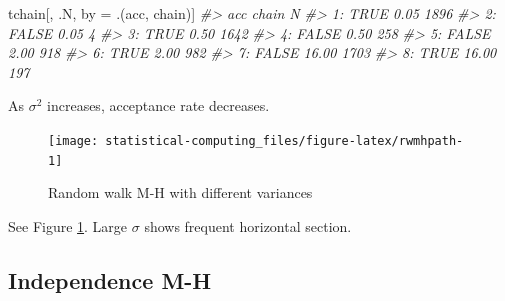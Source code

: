 \documentclass[]{book}
\newenvironment{Shaded}{\begin{snugshade}}{\end{snugshade}}
\newcommand{\CommentTok}[1]{\textcolor[rgb]{0.56,0.35,0.01}{\textit{#1}}}
\newcommand{\DataTypeTok}[1]{\textcolor[rgb]{0.13,0.29,0.53}{#1}}
\newcommand{\DecValTok}[1]{\textcolor[rgb]{0.00,0.00,0.81}{#1}}
\newcommand{\KeywordTok}[1]{\textcolor[rgb]{0.13,0.29,0.53}{\textbf{#1}}}
\newcommand{\NormalTok}[1]{#1}
\newcommand{\OperatorTok}[1]{\textcolor[rgb]{0.81,0.36,0.00}{\textbf{#1}}}
\newcommand{\StringTok}[1]{\textcolor[rgb]{0.31,0.60,0.02}{#1}}
\theoremstyle{definition}
\theoremstyle{definition}
\theoremstyle{definition}
\theoremstyle{remark}
\begin{document}
\begin{Shaded}
\begin{Highlighting}[]
\NormalTok{tchain[,}
\NormalTok{       .N,}
\NormalTok{       by =}\StringTok{ }\NormalTok{.(acc, chain)]}
\CommentTok{#>      acc chain    N}
\CommentTok{#> 1:  TRUE  0.05 1896}
\CommentTok{#> 2: FALSE  0.05    4}
\CommentTok{#> 3:  TRUE  0.50 1642}
\CommentTok{#> 4: FALSE  0.50  258}
\CommentTok{#> 5: FALSE  2.00  918}
\CommentTok{#> 6:  TRUE  2.00  982}
\CommentTok{#> 7: FALSE 16.00 1703}
\CommentTok{#> 8:  TRUE 16.00  197}
\end{Highlighting}
\end{Shaded}

As \(\sigma^2\) increases, acceptance rate decreases.

\begin{Shaded}
\end{Shaded}

\begin{figure}[H]

{\centering \texttt{[image: statistical-computing\_files/figure-latex/rwmhpath-1]} 

}

\caption{Random walk M-H with different variances}\label{fig:rwmhpath}
\end{figure}

See Figure \ref{fig:rwmhpath}. Large \(\sigma\) shows frequent horizontal section.

\hypertarget{independence-m-h}{%
\subsection{Independence M-H}\label{independence-m-h}}
\end{document}
